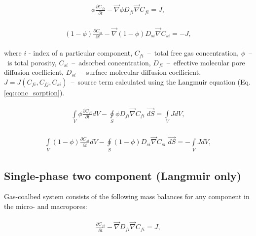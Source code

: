 \documentclass[a4paper,14pt,english]{extreport}
\begin{document}
\begin{eqnarray}
\begin{gathered}
\label{eq:diffusuin_multicomp_proper_free}
\phi \frac{\partial C_{fi}}{\partial t}  - \vec{\nabla} \phi D_{fi} \vec{\nabla}C_{fi} = J,
\end{gathered}
\end{eqnarray}

\begin{eqnarray}
\begin{gathered}
\label{eq:diffusuin_multicomp_proper_surface}
\left(1-\phi\right) \frac{\partial C_{si}}{\partial t}  - \vec{\nabla} \left(1-\phi\right) D_{si} \vec{\nabla}C_{si} = -J,
\end{gathered}
\end{eqnarray}

where $i$ - index of  a particular component, $C_{fi}$~--~total free gas concentration, $\phi$~--~is total porosity, $C_{si}$~--~adsorbed concentration, $D_{fi}$~--~effective molecular pore diffusion coefficient, $D_{si}$~--~surface molecular diffusion coefficient, $J=J\left(C_{fi}, C_{fj}, C_{si} \right)$~--~source term calculated using the Langmuir equation (Eq. \ref{eq:conc_sorption}).

\begin{eqnarray}
\begin{gathered}
\label{eq:diffusuin_multicomp_proper_free}
\int \limits_{V} \phi \frac{\partial C_{fi}}{\partial t} dV  - \oint \limits_{S} \phi D_{fi} \vec{\nabla}C_{fi} \; \vec{dS} = \int \limits_{V} J dV,
\end{gathered}
\end{eqnarray}

\begin{eqnarray}
\begin{gathered}
\label{eq:diffusuin_multicomp_proper_surface}
\int \limits_{V} \left(1-\phi\right) \frac{\partial C_{si}}{\partial t} dV - \oint \limits_{S} \left(1-\phi\right) D_{si} \vec{\nabla}C_{si} \; \vec{dS} = -\int \limits_{V}JdV,
\end{gathered}
\end{eqnarray}

 \subsection*{Single-phase two component (Langmuir only)}
Gas-coalbed system consists of the following mass balances for any component in the micro- and macropores:

\begin{eqnarray}
\begin{gathered}
\label{eq:diffusuin_multicomp_diff}
\frac{\partial C_{fi}}{\partial t} - \vec{\nabla} D_{fi} \vec{\nabla}C_{fi} = J,
\end{gathered}
\end{eqnarray}
\end{document}
